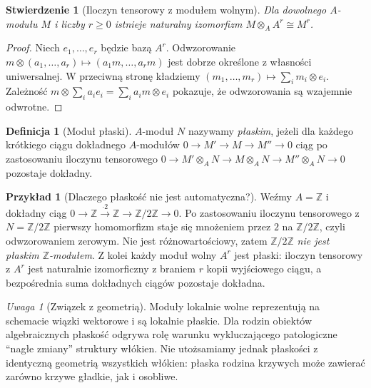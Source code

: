 \documentclass[11pt,a4paper,openany]{report}
\numberwithin{equation}{section}
\theoremstyle{plain}
\newtheorem{stwierdzenie}[twierdzenie]{Stwierdzenie}
\theoremstyle{definition}
\newtheorem{definicja}[twierdzenie]{Definicja}
\newtheorem{przyklad}[twierdzenie]{Przykład}
\theoremstyle{remark}
\newtheorem{uwaga}[twierdzenie]{Uwaga}
\newcommand{\Z}{\mathbb Z}
\begin{document}
\begin{stwierdzenie}[Iloczyn tensorowy z modułem wolnym]
Dla dowolnego $A$-modułu $M$ i liczby $r\ge0$
istnieje naturalny izomorfizm
$M\otimes_A A^r\cong M^r$.
\end{stwierdzenie}
\begin{proof}
Niech $e_1,\ldots,e_r$ będzie bazą $A^r$.
Odwzorowanie $m\otimes(a_1,\ldots,a_r)
\mapsto(a_1m,\ldots,a_rm)$ jest dobrze określone
z własności uniwersalnej. W przeciwną stronę
kładziemy $(m_1,\ldots,m_r)\mapsto
\sum_i m_i\otimes e_i$. Zależność
$m\otimes\sum_i a_i e_i=\sum_i a_i m\otimes e_i$
pokazuje, że odwzorowania są wzajemnie odwrotne.
\end{proof}

\begin{definicja}[Moduł płaski]
$A$-moduł $N$ nazywamy \emph{płaskim},
jeżeli dla każdego krótkiego ciągu dokładnego
$A$-modułów $0\to M'\to M\to M''\to0$
ciąg po zastosowaniu iloczynu tensorowego
$0\to M'\otimes_A N\to M\otimes_A N
\to M''\otimes_A N\to0$ pozostaje dokładny.
\end{definicja}

\begin{przyklad}[Dlaczego płaskość nie jest automatyczna?]
Weźmy $A=\Z$ i dokładny ciąg
$0\to\Z\xrightarrow{\cdot2}\Z\to\Z/2\Z\to0$.
Po zastosowaniu iloczynu tensorowego z $N=\Z/2\Z$ pierwszy
homomorfizm staje się mnożeniem przez $2$
na $\Z/2\Z$, czyli odwzorowaniem zerowym.
Nie jest różnowartościowy, zatem $\Z/2\Z$
\emph{nie jest płaskim $\Z$-modułem}.
Z kolei każdy moduł wolny $A^r$ jest płaski:
iloczyn tensorowy z $A^r$ jest naturalnie izomorficzny
z braniem $r$ kopii wyjściowego ciągu,
a bezpośrednia suma dokładnych ciągów pozostaje
dokładna.
\end{przyklad}

\begin{uwaga}[Związek z geometrią]
Moduły lokalnie wolne reprezentują na schemacie
wiązki wektorowe i są lokalnie płaskie.
Dla rodzin obiektów algebraicznych płaskość
odgrywa rolę warunku wykluczającego patologiczne
``nagłe zmiany'' struktury włókien. Nie utożsamiamy
jednak płaskości z identyczną geometrią wszystkich
włókien: płaska rodzina krzywych może zawierać
zarówno krzywe gładkie, jak i osobliwe.
\end{uwaga}
\end{document}

